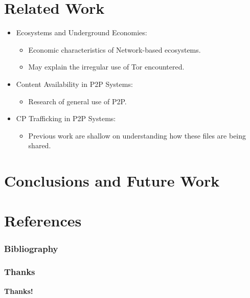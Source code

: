 \documentclass[notes]{beamer}
\begin{document}
\section{Related Work}
\begin{frame}

\begin{itemize}

\item[\checkmark]Ecosystems and Underground Economies:

	\begin{itemize}

	\item Economic characteristics of Network-based ecosystems.
	
	\item May explain the irregular use of Tor encountered.	
	
	\end{itemize}
	
\item[\checkmark]Content Availability in P2P Systems:

	\begin{itemize}
	
	\item Research of general use of P2P.	
	
	\end{itemize}

\item[\checkmark]CP Trafficking in P2P Systems:

	\begin{itemize}
	
	\item Previous work are shallow on understanding how these files are being shared.
	
	\end{itemize}

\end{itemize}

\end{frame}

\section{Conclusions and Future Work}
\begin{frame}

\end{frame}

\section{References}
\begin{frame} %

\frametitle{Bibliography}




\end{frame}

\begin{frame}
\frametitle{Thanks}
\vskip20pt

\begin{center}
{\bf \color{alert} Thanks!}
\end{center}

\vskip20pt

\begin{center}

\vskip12pt
\end{center}

\titlepage
\end{frame}
\end{document}
